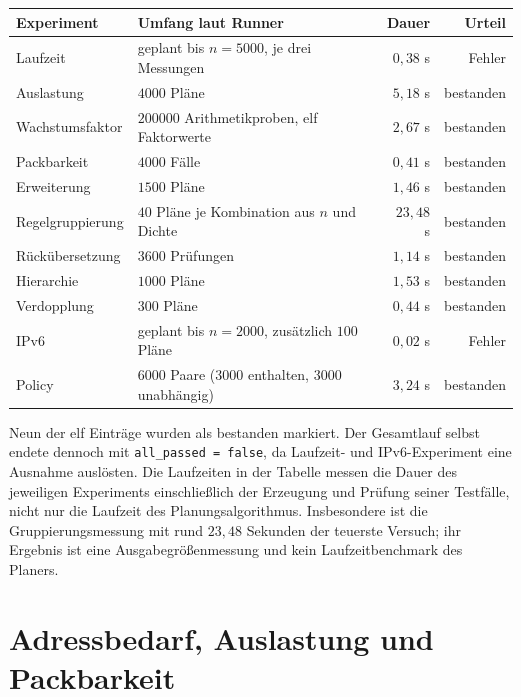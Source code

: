 \documentclass[a4paper,12pt, twoside]{report}
\theoremstyle{definition}
\begin{document}
\begin{center}
\small
\begin{tabularx}{\textwidth}{@{}p{3cm}Xr r@{}}
\toprule
Experiment & Umfang laut Runner & Dauer & Urteil \\
\midrule
Laufzeit & geplant bis $n=5000$, je drei Messungen & $0{,}38$ s & Fehler \\
Auslastung & $4000$ Pläne & $5{,}18$ s & bestanden \\
Wachstumsfaktor & $200000$ Arithmetikproben, elf Faktorwerte & $2{,}67$ s & bestanden \\
Packbarkeit & $4000$ Fälle & $0{,}41$ s & bestanden \\
Erweiterung & $1500$ Pläne & $1{,}46$ s & bestanden \\
Regelgruppierung & $40$ Pläne je Kombination aus $n$ und Dichte & $23{,}48$ s & bestanden \\
Rückübersetzung & $3600$ Prüfungen & $1{,}14$ s & bestanden \\
Hierarchie & $1000$ Pläne & $1{,}53$ s & bestanden \\
Verdopplung & $300$ Pläne & $0{,}44$ s & bestanden \\
IPv6 & geplant bis $n=2000$, zusätzlich $100$ Pläne & $0{,}02$ s & Fehler \\
Policy & $6000$ Paare ($3000$ enthalten, $3000$ unabhängig) & $3{,}24$ s & bestanden \\
\bottomrule
\end{tabularx}
\end{center}

Neun der elf Einträge wurden als bestanden markiert. Der Gesamtlauf selbst endete dennoch mit \texttt{all\_passed = false}, da Laufzeit- und IPv6-Experiment eine Ausnahme auslösten. Die Laufzeiten in der Tabelle messen die Dauer des jeweiligen Experiments einschließlich der Erzeugung und Prüfung seiner Testfälle, nicht nur die Laufzeit des Planungsalgorithmus. Insbesondere ist die Gruppierungsmessung mit rund $23{,}48$ Sekunden der teuerste Versuch; ihr Ergebnis ist eine Ausgabegrößenmessung und kein Laufzeitbenchmark des Planers.

\section{Adressbedarf, Auslastung und Packbarkeit}
\end{document}
